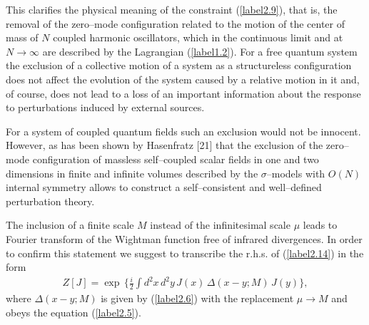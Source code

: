 \documentclass[a4paper,12pt] {article}
\begin{document}
This clarifies the physical meaning of the constraint
(\ref{label2.9}), that is, the removal of the zero--mode configuration
related to the motion of the center of mass of $N$ coupled harmonic
oscillators, which in the continuous limit and at $N \to \infty$ are
described by the Lagrangian (\ref{label1.2}).  For a free quantum
system the exclusion of a collective motion of a system as a
structureless configuration does not affect the evolution of the
system caused by a relative motion in it and, of course, does not lead
to a loss of an important information about the response to
perturbations induced by external sources.

For a system of coupled quantum fields such an exclusion would not be
innocent. However, as has been shown by Hasenfratz [21] that the
exclusion of the zero--mode configuration of massless self--coupled
scalar fields in one and two dimensions in finite and infinite volumes
described by the $\sigma$--models with $O(N)$ internal symmetry allows
to construct a self--consistent and well--defined perturbation theory.

The inclusion of a finite scale $M$ instead of the infinitesimal scale
$\mu$ leads to Fourier transform of the Wightman function free of
infrared divergences. In order to confirm this statement we suggest to
transcribe the r.h.s. of (\ref{label2.14}) in the form
%
\begin{eqnarray}\label{label2.20}
Z[J] = \exp\,\Big\{\frac{i}{2}\int
d^2x\,d^2y\,J(x)\,\Delta(x-y; M)\,J(y)\Big\},
\end{eqnarray}
%
where $\Delta(x-y; M)$ is given by (\ref{label2.6}) with the
replacement $\mu \to M$ and obeys the equation (\ref{label2.5}).
\end{document}
